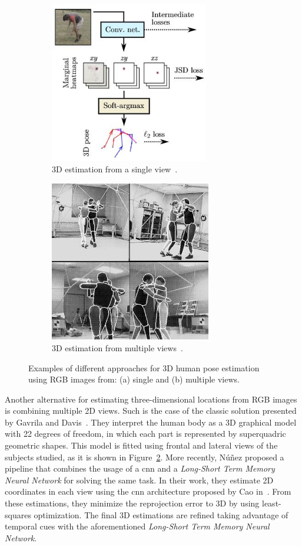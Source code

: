 \begin{figure}[h]\centering
    \begin{subfigure}{0.49\textwidth}\centering
        \includegraphics[height=7cm]{figures/nibali.JPG} 
        \caption{3D estimation from a single view~\cite{Nibali2019-yl}.}
        \label{subfig:single_view}
    \end{subfigure}
    \begin{subfigure}{0.49\textwidth}\centering
        \includegraphics[height=7cm]{figures/gavrila.JPG}
        \caption{3D estimation from multiple views~\cite{gavrila19963}.}
        \label{subfig:multi_view}
    \end{subfigure}
    \caption{Examples of different approaches for 3D human pose estimation using RGB images from: (a) single and (b) multiple views.}
    \label{fig:3d_from_rgb}
\end{figure}

Another alternative for estimating three-dimensional locations from RGB images is combining multiple 2D views. Such is the case of the classic solution presented by Gavrila and Davis~\cite{gavrila19963}. They interpret the human body as a 3D graphical model with 22 degrees of freedom, in which each part is represented by superquadric geometric shapes. This model is fitted using frontal and lateral views of the subjects studied, as it is shown in Figure~\ref{subfig:multi_view}. More recently, Núñez \etal\cite{nunez2019multiview} proposed a pipeline that combines the usage of a \gls{cnn} and a \emph{Long-Short Term Memory Neural Network} for solving the same task. In their work, they estimate 2D coordinates in each view using the \gls{cnn} architecture proposed by Cao \etal in~\cite{cao2018openpose}. From these estimations, they minimize the reprojection error to 3D by using least-squares optimization. The final 3D estimations are refined taking advantage of temporal cues with the aforementioned \emph{Long-Short Term Memory Neural Network}.
 
